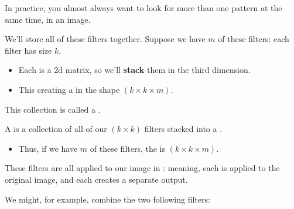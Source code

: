        In practice, you almost always want to look for more than one pattern at the same time, in an image. 

        We'll store all of these filters together. Suppose we have $m$ of these filters: each filter has size $k$.
        
        \begin{itemize}
            \item Each is a 2d matrix, so we'll \textbf{stack} them in the third dimension.
            \item This creating a  in the shape $(k \times k \times m)$.
        \end{itemize}

        

        This collection is called a .\\

        \begin{definition}
            A  is a collection of all of our $(k \times k)$ filters stacked into a .

            \begin{itemize}
                \item Thus, if we have $m$ of these filters, the  is $(k \times k \times m)$.
            \end{itemize}

            These filters are all applied to our image in : meaning, each is applied to the original image, and each creates a separate output.
        \end{definition}

        \miniex We might, for example, combine the two following filters:

